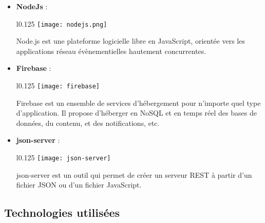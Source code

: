 \begin{itemize}
    \vspace{0.5cm}
    \item \textbf{NodeJs} :\\
    \begin{minipage}{\linewidth}
      \begin{wrapfigure}{l}{0.125\textwidth}
        \vspace{-0.5cm}
        \texttt{[image: nodejs.png]}
      \end{wrapfigure}
      Node.js est une plateforme logicielle libre en JavaScript, orientée vers les applications réseau évènementielles hautement concurrentes. \cite{nodejs}
    \end{minipage}
    \vspace{0.5cm}

    \item \textbf{Firebase} :\\
    \begin{minipage}{\linewidth}
      \begin{wrapfigure}{l}{0.125\textwidth}
        \vspace{-0.5cm}
        \texttt{[image: firebase]} 
      \end{wrapfigure}
      Firebase est un ensemble de services d'hébergement pour n'importe quel type d'application.
      Il propose d'héberger en NoSQL et en temps réel des bases de données, du contenu, et des notifications, etc. \cite{firebase}
    \end{minipage}
  \vspace{0.5cm}

    \item \textbf{json-server} :\\
    \begin{minipage}{\linewidth}
      \begin{wrapfigure}{l}{0.125\textwidth}
        \vspace{-0.5cm}
        \texttt{[image: json-server]} 
      \end{wrapfigure}
      json-server est un outil qui permet de créer un serveur REST à partir d'un fichier JSON ou d'un fichier JavaScript. \cite{jsonServer}
    \end{minipage}
  \end{itemize}


  \subsection{Technologies utilisées}

